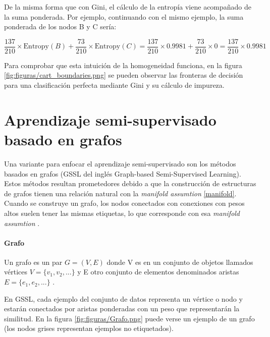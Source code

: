 De la misma forma que con Gini, el cálculo de la entropía viene acompañado de la suma ponderada. Por ejemplo, continuando con el mismo ejemplo, la suma ponderada de los nodos B y C sería:

\vspace{-.75cm}
\begin{center}
    \[\frac{137}{210} \times \text{Entropy}(B) +  \frac{73}{210} \times \text{Entropy}(C) = \frac{137}{210} \times 0.9981 +  \frac{73}{210} \times 0 = \frac{137}{210} \times 0.9981\] 
\end{center}

Para comprobar que esta intuición de la homogeneidad funciona, en la figura \ref{fig:figuras/cart_boundaries.png} se pueden observar las fronteras de decisión para una clasificación perfecta mediante Gini y su cálculo de impureza.


\section{Aprendizaje semi-supervisado basado en grafos}

Una variante para enfocar el aprendizaje semi-supervisado son los métodos basados en grafos (GSSL del inglés Graph-based Semi-Supervised Learning). Estos métodos resultan prometedores debido a que la construcción de estructuras de grafos tienen una relación natural con la \textit{manifold assumtion} \ref{manifold}. Cuando se construye un grafo, los nodos conectados con conexiones con pesos altos suelen tener las mismas etiquetas, lo que corresponde con esa \textit{manifold assumtion} \cite{song2022graph}.

\paragraph{Grafo} Un grafo es un par $G = (V,E)$ donde V es en un conjunto de objetos llamados vértices $V = \{v_1, v_2, ...\}$ y E otro conjunto de elementos denominados aristas $E = \{e_1, e_2, ...\}$ \cite{deo2017graph}. 


En GSSL, cada ejemplo del conjunto de datos representa un vértice o nodo y estarán conectados por aristas ponderadas con un peso que representarán la similitud. En la figura \ref{fig:figuras/Grafo.png} puede verse un ejemplo de un grafo (los nodos grises representan ejemplos no etiquetados).


